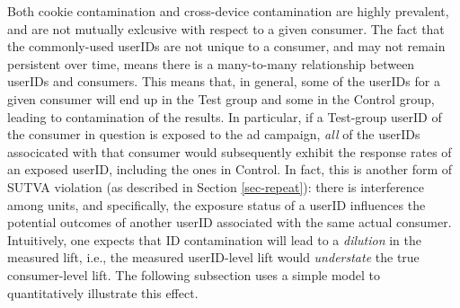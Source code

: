 \documentclass[11pt,a4paper]{article}
\theoremstyle{definition}
\theoremstyle{remark}
\theoremstyle{definition}
\theoremstyle{definition}
\theoremstyle{definition}
\theoremstyle{definition}
\theoremstyle{definition}
\theoremstyle{definition}
\begin{document}
Both cookie contamination and cross-device contamination are highly prevalent, and are not mutually exlcusive with respect to a given consumer. The fact that the commonly-used userIDs are not unique to a consumer, and may not remain persistent over time, means there is a many-to-many relationship between userIDs and consumers. This means that, in general, some of the userIDs for a given consumer will end up in the Test group and some in the Control group, leading to contamination of the results. In particular, if a Test-group userID of the consumer in question is exposed to the ad campaign, \textit{all} of the userIDs associcated with that consumer would subsequently exhibit the response rates of an exposed userID, including the ones in Control. In fact, this is another form of SUTVA violation (as described in Section \ref{sec-repeat}): there is interference among units, and specifically, the exposure status of a userID influences the potential outcomes of another userID associated with the same actual consumer. Intuitively, one expects that ID contamination will lead to a \textit{dilution} in the measured lift, i.e., the measured userID-level lift would \textit{understate} the true consumer-level lift. The following subsection uses a simple model to quantitatively illustrate this effect.
\end{document}

